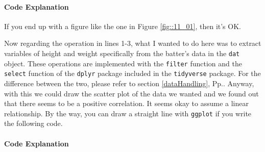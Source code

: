 \documentclass{ltjbook}
\begin{document}

\paragraph{Code Explanation}


If you end up with a figure like the one in Figure \ref{fig::11_01}, then it's OK.



Now regarding the operation in lines 1-3, what I wanted to do here was to extract variables of height and weight specifically from the batter's data in the \texttt{dat} object.
These operations are implemented with the \texttt{filter} function and the \texttt{select} function of the \texttt{dplyr} package included in the \texttt{tidyverse} package. For the difference between the two, please refer to section \ref{dataHandling}, Pp.\pageref{dataHandling}.
Anyway, with this we could draw the scatter plot of the data we wanted and we found out that there seems to be a positive correlation.
It seems okay to assume a linear relationship. By the way, you can draw a straight line with \texttt{ggplot} if you write the following code.


\paragraph{Code Explanation}

\end{document}
